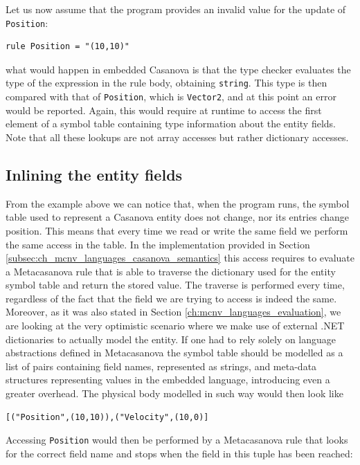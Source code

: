 Let us now assume that the program provides an invalid value for the update of \texttt{Position}:

\begin{lstlisting}
rule Position = "(10,10)"
\end{lstlisting}

\noindent
what would happen in embedded Casanova is that the type checker evaluates the type of the expression in the rule body, obtaining \texttt{string}. This type is then compared with that of \texttt{Position}, which is \texttt{Vector2}, and at this point an error would be reported. Again, this would require at runtime to access the first element of a symbol table containing type information about the entity fields. Note that all these lookups are not array accesses but rather dictionary accesses.

\subsection{Inlining the entity fields}
\label{subsec:ch_functors_inlining}
From the example above we can notice that, when the program runs, the symbol table used to represent a Casanova entity does not change, nor its entries change position. This means that every time we read or write the same field we perform the same access in the table. In the implementation provided in Section \ref{subsec:ch_mcnv_languages_casanova_semantics} this access requires to evaluate a Metacasanova rule that is able to traverse the dictionary used for the entity symbol table and return the stored value. The traverse is performed every time, regardless of the fact that the field we are trying to access is indeed the same. Moreover, as it was also stated in Section \ref{ch:mcnv_languages_evaluation}, we are looking at the very optimistic scenario where we make use of external .NET dictionaries to actually model the entity. If one had to rely solely on language abstractions defined in Metacasanova the symbol table should be modelled as a list of pairs containing field names, represented as strings, and meta-data structures representing values in the embedded language, introducing even a greater overhead. The physical body modelled in such way would then look like

\begin{lstlisting}
[("Position",(10,10)),("Velocity",(10,0)]
\end{lstlisting}

Accessing \texttt{Position} would then be performed by a Metacasanova rule that looks for the correct field name and stops when the field in this tuple has been reached:

